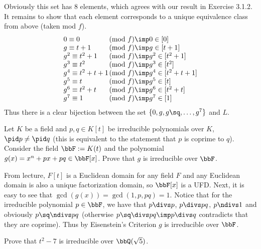 \documentclass{article}
\begin{document}
\begin{solution}
Obviously this set has 8 elements, which agrees with our result in Exercise 3.1.2. It remains to show that each element corresponds to a unique equivalence class from above (taken mod $ f $).
\[\begin{array}{lll}
  0   \equiv 0       &\!\!\!\!\!\!\!\!\pmod f \imp 0 \in [0] \\
  g   \equiv t+1     &\!\!\!\!\!\!\!\!\pmod f \imp g \in [t+1] \\
  g^2 \equiv t^2+1   &\!\!\!\!\!\!\!\!\pmod f \imp g^2 \in [t^2+1] \\
  g^3 \equiv t^2     &\!\!\!\!\!\!\!\!\pmod f \imp g^3 \in [t^2] \\
  g^4 \equiv t^2+t+1 &\!\!\!\!\!\!\!\!\pmod f \imp g^4 \in [t^2+t+1] \\
  g^5 \equiv t       &\!\!\!\!\!\!\!\!\pmod f \imp g^5 \in [t] \\
  g^6 \equiv t^2+t   &\!\!\!\!\!\!\!\!\pmod f \imp g^6 \in [t^2+t] \\
  g^7 \equiv 1       &\!\!\!\!\!\!\!\!\pmod f \imp g^7 \in [1]
\end{array}\]
Thus there is a clear bijection between the set $ \{0,g,g\sq,\ldots,g^7\} $ and $ L $.
\end{solution}

\begin{exercise}
Let $K$ be a field and $p, q \in K[t]$ be irreducible polynomials over $K$, $\pid p \neq \pid q$ (this is equivalent to the statement that $p$ is coprime to $q$). Consider the field $\bbF := K(t)$ and the polynomial $g(x) = x^n + px + pq \in \bbF[x]$. Prove that $g$ is irreducible over $\bbF$.
\end{exercise}

\begin{solution}
From lecture, $ F[t] $ is a Euclidean domain for any field $ F $ and any Euclidean domain is also a unique factorization domain, so $ \bbF[x] $ is a UFD. Next, it is easy to see that $ \gcd(g(x)) = \gcd(1, p, pq) = 1 $. Notice that for the irreducible polynomial $ p \in \bbF $, we have that $ p \divs p $, $ p\divs pq $, $ p\ndivs 1 $ and obviously $ p\sq \ndivs pq $ (otherwise $ p\sq\divs pq \imp p\divs q $ contradicts that they are coprime). Thus by Eisenstein's Criterion $ g $ is irreducible over $ \bbF $.
\end{solution}

\begin{exercise}
Prove that $ t^2 -7 $ is irreducible over $ \bbQ(\sqrt 5) $.
\end{exercise}
\end{document}
